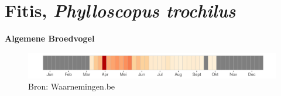\documentclass[11pt]{book}
\begin{document}



\chapter{Fitis, \itshape Phylloscopus trochilus}

\textbf{Algemene Broedvogel} 
\vspace{5mm} %



 \begin{figure}[H]
 \caption*{Bron: Waarnemingen.be}   
  \vspace{-1.2em}
  \includegraphics{Kalender/Fitis.pdf}
  \end{figure}
\end{document}
